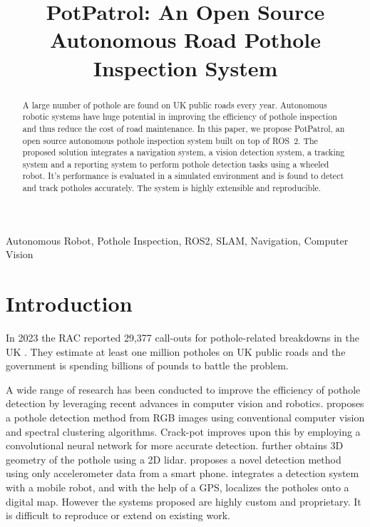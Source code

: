 \documentclass[conference]{IEEEtran}
\begin{document}
\title{PotPatrol: An Open Source Autonomous Road Pothole Inspection System}

\author{
}

\maketitle

\begin{abstract}
A large number of pothole are found on UK public roads every year. Autonomous robotic systems have huge potential in improving the efficiency of pothole inspection and thus reduce the cost of road maintenance. In this paper, we propose PotPatrol, an open source autonomous pothole inspection system built on top of ROS~2. The proposed solution integrates a navigation system, a vision detection system, a tracking system and a reporting system to perform pothole detection tasks using a wheeled robot. It's performance is evaluated in a simulated environment and is found to detect and track potholes accurately. The system is highly extensible and reproducible.
\end{abstract}

\begin{IEEEkeywords}
Autonomous Robot, Pothole Inspection, ROS2, SLAM, Navigation, Computer Vision
\end{IEEEkeywords}

\section{Introduction}

In 2023 the RAC reported 29,377 call-outs for pothole-related breakdowns in the UK \cite{RACPotholeIndex}. They estimate at least one million potholes on UK public roads and the government is spending billions of pounds to battle the problem.

A wide range of research has been conducted to improve the efficiency of pothole detection by leveraging recent advances in computer vision and robotics. \cite{omanovicPotholeDetectionImage2013} proposes a pothole detection method from RGB images using conventional computer vision and spectral clustering algorithms. Crack-pot \cite{anandCrackpotAutonomousRoad2018} improves upon this by employing a convolutional neural network for more accurate detection. \cite{kangPotholeDetectionSystem2017} further obtains 3D geometry of the pothole using a 2D lidar. \cite{RealTimePothole} proposes a novel detection method using only accelerometer data from a smart phone.
\cite{brunoRobotizedRaspberryBasedSystem2023} integrates a detection system with a mobile robot, and with the help of a GPS, localizes the potholes onto a digital map. However the systems proposed are highly custom and proprietary. It is difficult to reproduce or extend on existing work.
\end{document}
